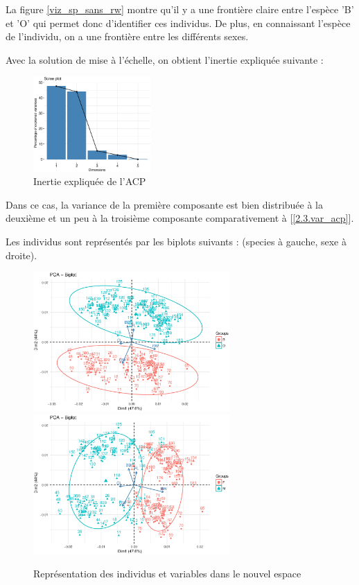 \documentclass{article}
\begin{document}
La figure \ref{viz_sp_sans_rw} montre qu'il y a une frontière claire entre l'espèce 'B' et 'O' qui permet donc d'identifier ces individus. De plus, en connaissant l'espèce de l'individu, on a une frontière entre les différents sexes.



Avec la solution de mise à l'échelle, on obtient l'inertie expliquée suivante :

\begin{figure}[H]
\centering
\includegraphics[width=4.5cm]{./img/2-3_screeplot_scaled.eps}
\caption{Inertie expliquée de l'ACP}
\label{2.3.screeplot_scaled}
\end{figure}
Dans ce cas, la variance de la première composante est bien distribuée à la deuxième et un peu à la troisième composante comparativement à [\ref{2.3.var_acp}].

Les individus sont représentés par les biplots suivants :
(species à gauche, sexe à droite).
\begin{figure}[H]
\centering
\includegraphics[width=7.5cm]{./img/2-3_biplot_pca_scaled_sp.eps}
\includegraphics[width=7.5cm]{./img/2-3_biplot_pca_scaled_sex.eps}
\caption{Représentation des individus et variables dans le nouvel espace}
\label{2.3.biplot_scaled_sp}
\end{figure}
\end{document}
